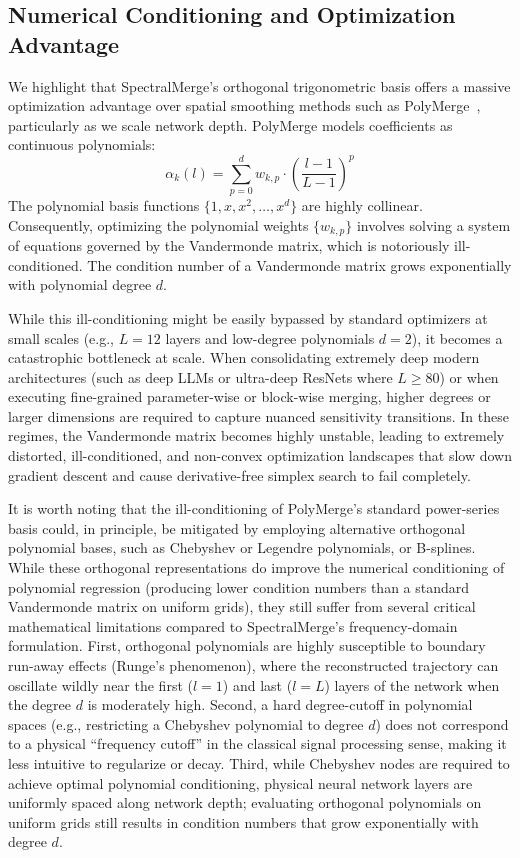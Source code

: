 \subsection{Numerical Conditioning and Optimization Advantage}
We highlight that SpectralMerge's orthogonal trigonometric basis offers a massive optimization advantage over spatial smoothing methods such as PolyMerge~\cite{polymerge}, particularly as we scale network depth. PolyMerge models coefficients as continuous polynomials:
\begin{equation}
    \alpha_k(l) = \sum_{p=0}^d w_{k, p} \cdot \left(\frac{l - 1}{L - 1}\right)^p
\end{equation}
The polynomial basis functions $\{1, x, x^2, \dots, x^d\}$ are highly collinear. Consequently, optimizing the polynomial weights $\{w_{k,p}\}$ involves solving a system of equations governed by the Vandermonde matrix, which is notoriously ill-conditioned. The condition number of a Vandermonde matrix grows exponentially with polynomial degree $d$. 

While this ill-conditioning might be easily bypassed by standard optimizers at small scales (e.g., $L=12$ layers and low-degree polynomials $d=2$), it becomes a catastrophic bottleneck at scale. When consolidating extremely deep modern architectures (such as deep LLMs or ultra-deep ResNets where $L \ge 80$) or when executing fine-grained parameter-wise or block-wise merging, higher degrees or larger dimensions are required to capture nuanced sensitivity transitions. In these regimes, the Vandermonde matrix becomes highly unstable, leading to extremely distorted, ill-conditioned, and non-convex optimization landscapes that slow down gradient descent and cause derivative-free simplex search to fail completely.

It is worth noting that the ill-conditioning of PolyMerge's standard power-series basis could, in principle, be mitigated by employing alternative orthogonal polynomial bases, such as Chebyshev or Legendre polynomials, or B-splines. While these orthogonal representations do improve the numerical conditioning of polynomial regression (producing lower condition numbers than a standard Vandermonde matrix on uniform grids), they still suffer from several critical mathematical limitations compared to SpectralMerge's frequency-domain formulation. First, orthogonal polynomials are highly susceptible to boundary run-away effects (Runge's phenomenon), where the reconstructed trajectory can oscillate wildly near the first ($l=1$) and last ($l=L$) layers of the network when the degree $d$ is moderately high. Second, a hard degree-cutoff in polynomial spaces (e.g., restricting a Chebyshev polynomial to degree $d$) does not correspond to a physical ``frequency cutoff'' in the classical signal processing sense, making it less intuitive to regularize or decay. Third, while Chebyshev nodes are required to achieve optimal polynomial conditioning, physical neural network layers are uniformly spaced along network depth; evaluating orthogonal polynomials on uniform grids still results in condition numbers that grow exponentially with degree $d$.

